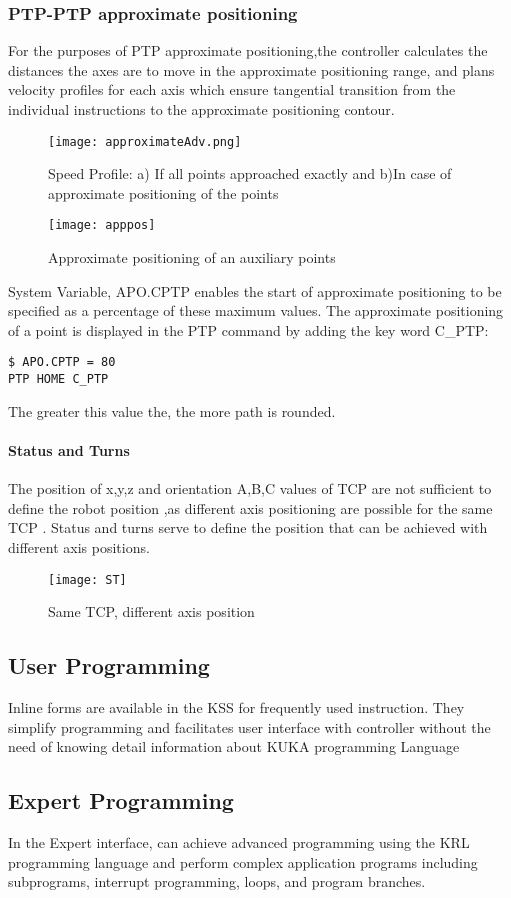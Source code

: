 \subsubsection{PTP-PTP approximate positioning }
For the purposes of PTP approximate positioning,the controller calculates the distances the axes are to move in the approximate positioning range, and plans velocity profiles for each axis which ensure tangential transition from the individual instructions to the approximate positioning contour.
 \begin{figure}[H]
    \centering
    \texttt{[image: approximateAdv.png]}
    \caption[Speed Profiles]{Speed Profile: a) If all points approached exactly and b)In  case of approximate positioning of the points}
\end{figure}
\begin{figure}[H]
    \centering
    \texttt{[image: apppos]}
    \caption{Approximate positioning of an auxiliary points}
\end{figure}
 System Variable, \textdollar APO.CPTP enables the start of approximate positioning to be specified as a percentage of these maximum values.
The approximate positioning of a point is displayed in the PTP command by adding the key word C\_PTP: 
\begin{lstlisting}[language=terCmd]
$ APO.CPTP = 80
PTP HOME C_PTP
\end{lstlisting}
The greater this value the, the more path is rounded.


\paragraph{Status and Turns}
The position of x,y,z and orientation A,B,C values of TCP are not sufficient to define the robot position ,as different axis positioning  are possible for the same TCP .
Status and turns serve to define the position that can be achieved with different axis positions.
\begin{figure}[H]
	\centering
	\texttt{[image: ST]}
    	\caption{Same TCP, different axis position}
\end{figure}
\subsection{User Programming}
Inline forms are available in the KSS for frequently used instruction. They simplify programming and facilitates user interface with controller without the need of knowing detail information about KUKA programming Language

 \subsection{Expert Programming}
 In the Expert interface, can achieve advanced programming using the KRL programming language and perform complex application programs including subprograms, interrupt programming, loops, and program branches.